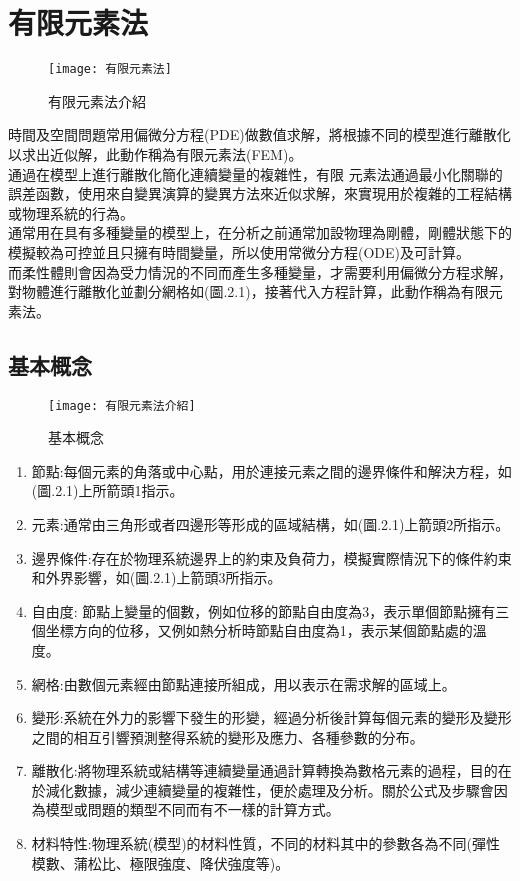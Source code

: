 \chapter{有限元素法}

\begin{figure}[hbt!]
\begin{center}
\texttt{[image: 有限元素法]}
\caption{\Large 有限元素法介紹}\label{有限元素法}
\end{center}
\end{figure}
時間及空間問題常用偏微分方程(PDE)做數值求解，將根據不同的模型進行離散化以求出近似解，此動作稱為有限元素法(FEM)。\\
通過在模型上進行離散化簡化連續變量的複雜性，有限
元素法通過最小化關聯的誤差函數，使用來自變異演算的變異方法來近似求解，來實現用於複雜的工程結構或物理系統的行為。\\
通常用在具有多種變量的模型上，在分析之前通常加設物理為剛體，剛體狀態下的模擬較為可控並且只擁有時間變量，所以使用常微分方程(ODE)及可計算。\\
而柔性體則會因為受力情況的不同而產生多種變量，才需要利用偏微分方程求解，對物體進行離散化並劃分網格如(圖.2.1)，接著代入方程計算，此動作稱為有限元素法。\\
\newpage
\section{基本概念}

\begin{figure}[hbt!]
\begin{center}
\texttt{[image: 有限元素法介紹]}
\caption{\Large 基本概念}\label{有限元素法介紹}
\end{center}
\end{figure}

\begin{enumerate}
\item 節點:每個元素的角落或中心點，用於連接元素之間的邊界條件和解決方程，如(圖.2.1)上所箭頭1指示。
\item 元素:通常由三角形或者四邊形等形成的區域結構，如(圖.2.1)上箭頭2所指示。
\item 邊界條件:存在於物理系統邊界上的約束及負荷力，模擬實際情況下的條件約束和外界影響，如(圖.2.1)上箭頭3所指示。
\item 自由度: 節點上變量的個數，例如位移的節點自由度為3，表示單個節點擁有三個坐標方向的位移，又例如熱分析時節點自由度為1，表示某個節點處的溫度。
\item 網格:由數個元素經由節點連接所組成，用以表示在需求解的區域上。
\item 變形:系統在外力的影響下發生的形變，經過分析後計算每個元素的變形及變形之間的相互引響預測整得系統的變形及應力、各種參數的分布。
\item 離散化:將物理系統或結構等連續變量通過計算轉換為數格元素的過程，目的在於減化數據，減少連續變量的複雜性，便於處理及分析。關於公式及步驟會因為模型或問題的類型不同而有不一樣的計算方式。
\item 材料特性:物理系統(模型)的材料性質，不同的材料其中的參數各為不同(彈性模數、蒲松比、極限強度、降伏強度等)。\\
\end{enumerate}

